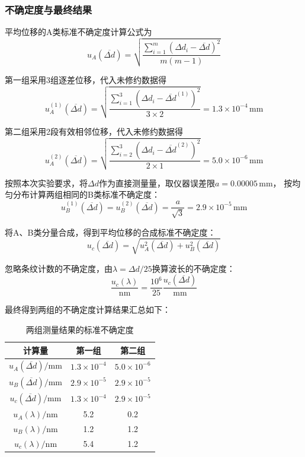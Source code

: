 \documentclass[10pt,a4paper]{ctexart} %
\begin{document}
  \subsubsection{不确定度与最终结果}
  平均位移的A类标准不确定度计算公式为
  \[
    u_A(\overline{\Delta d})
    =\sqrt{\frac{\sum_{i=1}^{m}(\Delta d_i-\overline{\Delta d})^2}{m(m-1)}}
  \]

  第一组采用3组逐差位移，代入未修约数据得
  \[
    u_A^{(1)}(\overline{\Delta d})
    =\sqrt{\frac{\sum_{i=1}^{3}(\Delta d_i-\overline{\Delta d}^{(1)})^2}{3\times2}}
    =1.3\times10^{-4}\,\mathrm{mm}
  \]

  第二组采用2段有效相邻位移，代入未修约数据得
  \[
    u_A^{(2)}(\overline{\Delta d})
    =\sqrt{\frac{\sum_{i=2}^{3}(\Delta d_i-\overline{\Delta d}^{(2)})^2}{2\times1}}
    =5.0\times10^{-6}\,\mathrm{mm}
  \]

  按照本次实验要求，将$\Delta d$作为直接测量量，取仪器误差限$a=0.00005\,\mathrm{mm}$，
  按均匀分布计算两组相同的B类标准不确定度：
  \[
    u_B^{(1)}(\overline{\Delta d})=u_B^{(2)}(\overline{\Delta d})
    =\frac{a}{\sqrt3}=2.9\times10^{-5}\,\mathrm{mm}
  \]
  
  将A、B类分量合成，得到平均位移的合成标准不确定度：
  \[
    u_c(\overline{\Delta d})
    =\sqrt{u_A^2(\overline{\Delta d})+u_B^2(\overline{\Delta d})}
  \]

  忽略条纹计数的不确定度，由$\lambda=\Delta d/25$换算波长的不确定度：
  \[
    \frac{u_c(\lambda)}{\mathrm{nm}}
    =\frac{10^6}{25}\frac{u_c(\overline{\Delta d})}{\mathrm{mm}}
  \]

  最终得到两组的不确定度计算结果汇总如下：
  \begin{table}[H]
    \centering
    \caption{两组测量结果的标准不确定度}
    \begin{tabular}{ccc}
      \toprule
      计算量 & 第一组 & 第二组 \\
      \midrule
      $u_A(\overline{\Delta d})/\mathrm{mm}$ & $1.3\times10^{-4}$ & $5.0\times10^{-6}$ \\
      $u_B(\overline{\Delta d})/\mathrm{mm}$ & $2.9\times10^{-5}$ & $2.9\times10^{-5}$ \\
      $u_c(\overline{\Delta d})/\mathrm{mm}$ & $1.3\times10^{-4}$ & $2.9\times10^{-5}$ \\
      $u_A(\lambda)/\mathrm{nm}$ & 5.2 & 0.2 \\
      $u_B(\lambda)/\mathrm{nm}$ & 1.2 & 1.2 \\
      $u_c(\lambda)/\mathrm{nm}$ & 5.4 & 1.2 \\
      \bottomrule
    \end{tabular}
  \end{table}
\end{document}

